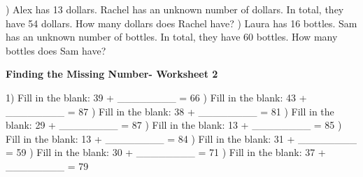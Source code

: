 \documentclass{article}%
\begin{document}
) Alex has 13 dollars. Rachel has an unknown number of dollars. In total, they have 54 dollars. How many dollars does Rachel have?%
\newline%
\newline%
) Laura has 16 bottles. Sam has an unknown number of bottles. In total, they have 60 bottles. How many bottles does Sam have?%
\newline%
\newline%
\newline%
\pagebreak%
\large%
\begin{center}%
\textbf{Finding the Missing Number- Worksheet 2}%
\newline%
\newline%
\newline%
\end{center} \normalsize%
1) Fill in the blank: 39 + \_\_\_\_\_\_\_\_ = 66%
\newline%
\newline%
) Fill in the blank: 43 + \_\_\_\_\_\_\_\_ = 87%
\newline%
\newline%
) Fill in the blank: 38 + \_\_\_\_\_\_\_\_ = 81%
\newline%
\newline%
) Fill in the blank: 29 + \_\_\_\_\_\_\_\_ = 87%
\newline%
\newline%
) Fill in the blank: 13 + \_\_\_\_\_\_\_\_ = 85%
\newline%
\newline%
) Fill in the blank: 13 + \_\_\_\_\_\_\_\_ = 84%
\newline%
\newline%
) Fill in the blank: 31 + \_\_\_\_\_\_\_\_ = 59%
\newline%
\newline%
) Fill in the blank: 30 + \_\_\_\_\_\_\_\_ = 71%
\newline%
\newline%
) Fill in the blank: 37 + \_\_\_\_\_\_\_\_ = 79%
\end{document}
